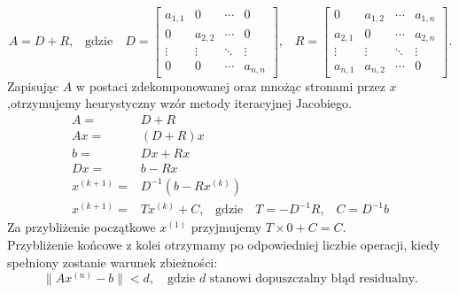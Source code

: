 \documentclass[a4paper,margin=1.54cm]{article}
\begin{document}
\[
A = D + R
\textrm{,} \quad \textrm{gdzie} \quad
D =
 \begin{bmatrix}
  a_{1,1} & 0 & \cdots & 0 \\
  0 & a_{2,2} & \cdots & 0 \\
  \vdots  & \vdots  & \ddots & \vdots  \\
  0 & 0 & \cdots & a_{n,n} 
 \end{bmatrix}
\textrm{,} \quad
R =
 \begin{bmatrix}
  0 & a_{1,2} & \cdots & a_{1,n} \\
  a_{2,1} & 0 & \cdots & a_{2,n} \\
  \vdots  & \vdots  & \ddots & \vdots  \\
  a_{n,1} & a_{n,2} & \cdots & 0
 \end{bmatrix}
\textrm{.}
\]
Zapisując $A$ w postaci zdekomponowanej oraz mnożąc stronami przez $x$,\linebreak otrzymujemy heurystyczny wzór metody iteracyjnej Jacobiego.
\begin{align*}
A =& D + R\\
Ax =& (D + R)x\\
b =& Dx + Rx\\
Dx =& b - Rx\\
x^{(k+1)} =& D^{-1}(b-Rx^{(k)})\\
x^{(k+1)} =& Tx^{(k)}+C\textrm{,} \quad \textrm{gdzie} \quad T = -D^{-1}R \textrm{,} \quad C=D^{-1}b 
\end{align*}
Za przybliżenie początkowe $x^{(1)}$ przyjmujemy $T\times 0 + C = C$. \\
Przybliżenie końcowe z kolei otrzymamy po odpowiedniej liczbie operacji, kiedy spełniony zostanie warunek zbieżności:
\[
	\|Ax^{(n)} - b\| < d, \quad \textrm{gdzie } d \textrm{ stanowi dopuszczalny błąd residualny.}
\]

\newpage
\end{document}
